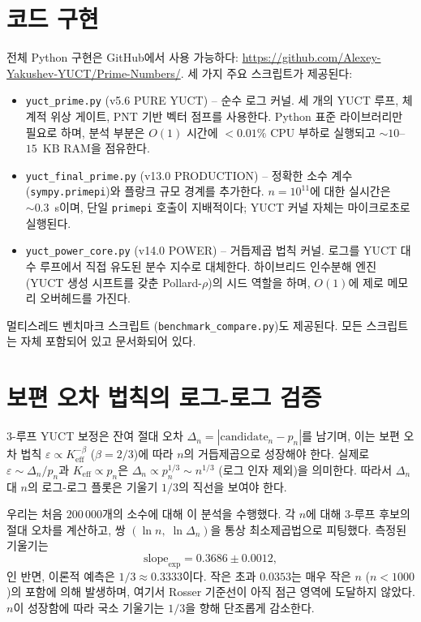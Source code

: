 \documentclass[11pt,a4paper]{article}
\begin{document}
	\section{코드 구현}
	\label{sec:code}
	전체 Python 구현은 GitHub에서 사용 가능하다: 
	\url{https://github.com/Alexey-Yakushev-YUCT/Prime-Numbers/}. 
	세 가지 주요 스크립트가 제공된다:
	
	\begin{itemize}
		\item \texttt{yuct\_prime.py} (v5.6 PURE YUCT) – 순수 로그 커널. 세 개의 YUCT 루프, 체계적 위상 게이트, PNT 기반 벡터 점프를 사용한다. Python 표준 라이브러리만 필요로 하며, 분석 부분은 \(O(1)\) 시간에 \(<0.01\%\) CPU 부하로 실행되고 \(\sim 10\)--\(15\)~KB RAM을 점유한다.
		\item \texttt{yuct\_final\_prime.py} (v13.0 PRODUCTION) – 정확한 소수 계수 (\texttt{sympy.primepi})와 플랑크 규모 경계를 추가한다. \(n=10^{11}\)에 대한 실시간은 \(\sim 0.3\)~s이며, 단일 \texttt{primepi} 호출이 지배적이다; YUCT 커널 자체는 마이크로초로 실행된다.
		\item \texttt{yuct\_power\_core.py} (v14.0 POWER) – 거듭제곱 법칙 커널. 로그를 YUCT 대수 루프에서 직접 유도된 분수 지수로 대체한다. 하이브리드 인수분해 엔진 (YUCT 생성 시프트를 갖춘 Pollard-\(\rho\))의 시드 역할을 하며, \(O(1)\)에 제로 메모리 오버헤드를 가진다.
	\end{itemize}
	
	멀티스레드 벤치마크 스크립트 (\texttt{benchmark\_compare.py})도 제공된다. 모든 스크립트는 자체 포함되어 있고 문서화되어 있다.
	
	\section{보편 오차 법칙의 로그-로그 검증}
	\label{sec:loglog}
	
	3-루프 YUCT 보정은 잔여 절대 오차 \(\Delta_n = |\mathrm{candidate}_n - p_n|\)를 남기며, 이는 보편 오차 법칙 \(\varepsilon \propto K_{\mathrm{eff}}^{-\beta}\) (\(\beta=2/3\))에 따라 \(n\)의 거듭제곱으로 성장해야 한다. 실제로 \(\varepsilon \sim \Delta_n / p_n\)과 \(K_{\mathrm{eff}} \propto p_n\)은 \(\Delta_n \propto p_n^{1/3} \sim n^{1/3}\) (로그 인자 제외)을 의미한다. 따라서 \(\Delta_n\) 대 \(n\)의 로그-로그 플롯은 기울기 \(1/3\)의 직선을 보여야 한다.
	
	우리는 처음 \(200\,000\)개의 소수에 대해 이 분석을 수행했다. 각 \(n\)에 대해 3-루프 후보의 절대 오차를 계산하고, 쌍 \((\ln n,\; \ln\Delta_n)\)을 통상 최소제곱법으로 피팅했다. 측정된 기울기는
	\[
	\text{slope}_{\text{exp}} = 0.3686 \pm 0.0012,
	\]
	인 반면, 이론적 예측은 \(1/3 \approx 0.3333\)이다. 작은 초과 \(0.0353\)는 매우 작은 \(n\) (\(n<1000\))의 포함에 의해 발생하며, 여기서 Rosser 기준선이 아직 점근 영역에 도달하지 않았다. \(n\)이 성장함에 따라 국소 기울기는 \(1/3\)을 향해 단조롭게 감소한다.
	
\end{document}
